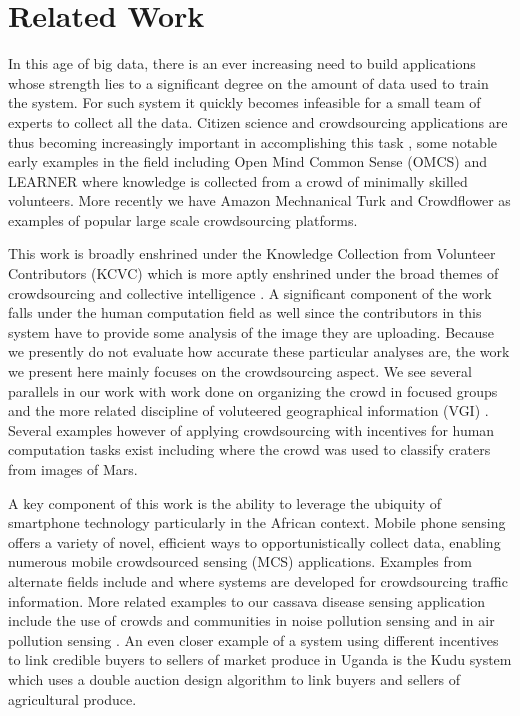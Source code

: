 \documentclass[letterpaper]{article} %
\begin{document}
\section{Related Work}
In this age of big data, there is an ever increasing need to build applications whose strength lies to a significant degree on the amount of data used to train the system. For such system it quickly becomes infeasible for a small team of experts to collect all the data. Citizen science and crowdsourcing applications are thus becoming increasingly important in accomplishing this task \cite{kittur2013future}, some notable early examples in the field including Open Mind Common Sense (OMCS) \cite{singh2002open} and LEARNER \cite{chklovski2003learner} where knowledge is collected from a crowd of minimally skilled volunteers. More recently we have Amazon Mechnanical Turk \cite{paolacci2010running} and Crowdflower \cite{van2012designing} as examples of popular large scale crowdsourcing platforms.

This work is broadly enshrined under the Knowledge Collection from Volunteer Contributors (KCVC) \cite{chklovski2005towards} which is more aptly enshrined under the broad themes of crowdsourcing and collective intelligence \cite{quinn2011human}. A significant component of the work falls under the human computation field as well since the contributors in this system have to provide some analysis of the image they are uploading. Because we presently do not evaluate how accurate these particular analyses are, the work we present here mainly focuses on the crowdsourcing aspect. We see several parallels in our work with work done on organizing the crowd in focused groups \cite{zhu2012organizing} and the more related discipline of voluteered geographical information (VGI) \cite{haklay2013citizen}. Several examples however of applying crowdsourcing with incentives for human computation tasks exist including \cite{kanefsky2001can} where the crowd was used to classify craters from images of Mars.

A key component of this work is the ability to leverage the ubiquity of smartphone technology particularly in the African context. Mobile phone sensing offers a variety of novel, efficient ways to opportunistically collect data, enabling numerous mobile crowdsourced sensing (MCS) applications. Examples from alternate fields include \cite{mohan2008nericell} and \cite{thiagarajan2009vtrack} where systems are developed for crowdsourcing traffic information. More related examples to our cassava disease sensing application include the use of crowds and communities in noise pollution sensing \cite{rana2010ear} and in air pollution sensing \cite{stevens2010crowdsourcing}. An even closer example of a system using different incentives to link credible buyers to sellers of market produce in Uganda is the Kudu system \cite{ssekibuule2013mobile} which uses a double auction design algorithm to link buyers and sellers of agricultural produce.
\\
\end{document}
